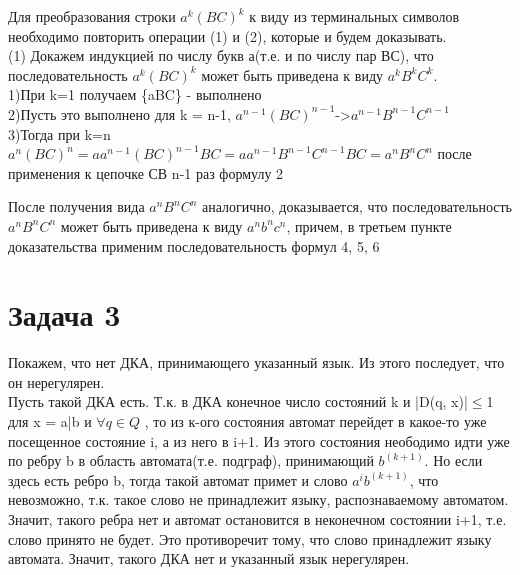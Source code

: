 \documentclass[a4paper,12pt]{article} %
\begin{document}
Для преобразования строки $a^{k}(BC)^{k}$ к виду из терминальных символов необходимо повторить  операции (1) и (2), которые и будем доказывать.\\

(1) Докажем индукцией по числу букв а(т.е. и по числу пар ВС), что последовательность $a^{k}(BC)^{k}$ может быть приведена к виду $a^{k}B^{k}C^{k}$.\\

1)При k=1 получаем \{aBC\} - выполнено\\
2)Пусть это выполнено для k = n-1, $a^{n-1}(BC)^{n-1}$->$a^{n-1}B^{n-1}C^{n-1}$\\
3)Тогда при k=n $a^{n}(BC)^{n}=aa^{n-1}(BC)^{n-1}BC=aa^{n-1}B^{n-1}C^{n-1}BC=a^{n}B^{n}C^{n}$
после применения к цепочке СВ n-1 раз формулу 2

После получения вида $a^{n}B^{n}C^{n}$ аналогично, доказывается, что последовательность $a^{n}B^{n}C^{n}$ может быть приведена к виду $a^{n}b^{n}c^{n}$, причем, в третьем пункте доказательства применим последовательность формул 4, 5, 6\\
       


 



\section*{Задача 3}
Покажем, что нет ДКА, принимающего указанный язык. Из этого последует, что он нерегулярен.\\ 
Пусть такой ДКА есть. Т.к. в ДКА конечное число состояний k и |D(q, x)|$\leq$1 для x = a|b и $\forall q \in Q$ , то из к-ого состояния автомат перейдет в какое-то уже посещенное состояние i, а из него в i+1. Из этого состояния неободимо идти уже по ребру b в область автомата(т.е. подграф), принимающий $b^(k+1)$. Но если здесь есть ребро b, тогда такой автомат примет и слово $a^ib^(k+1)$, что невозможно, т.к. такое слово не принадлежит языку, распознаваемому автоматом. Значит, такого ребра нет и автомат остановится в неконечном состоянии i+1, т.е. слово принято не будет. Это противоречит тому, что слово принадлежит языку автомата. Значит, такого ДКА нет и указанный язык нерегулярен.\\  
\end{document}
